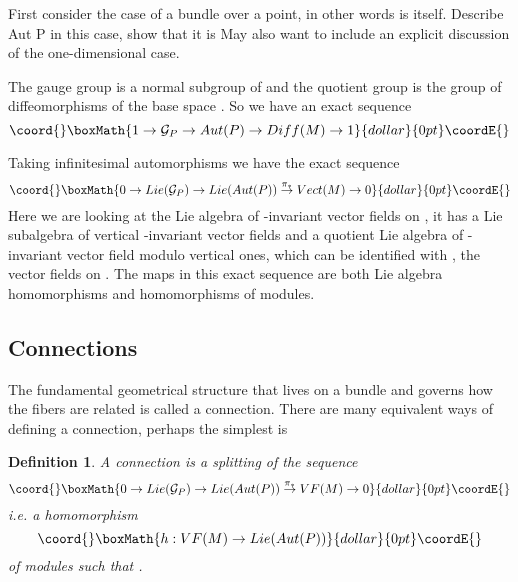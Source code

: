 \documentclass[a4paper,a4paper]{article}
\newtheorem{define}{Definition}
\theoremstyle{conjecture}
\begin{document}
First consider the case of a \coordHE{} bundle over a point, in other words \coordHE{} is \coordHE{} itself.  Describe Aut P in this case, show that it is \coordHE{}
May also want to include an explicit discussion of the one-dimensional case.

The gauge group \coordHE{} is a normal subgroup of \coordHE{} and the
quotient group is the group \coordHE{} of diffeomorphisms of the base space \coordHE{}.  So we have an exact sequence 
$$\coord{}\boxMath{1\rightarrow {\mathcal G}_P\rightarrow Aut(P)\rightarrow Diff(M)\rightarrow 1}{dollar}{0pt}\coordE{}$$

Taking infinitesimal automorphisms we have the exact sequence
$$\coord{}\boxMath{0\rightarrow Lie ({\mathcal G}_P)\rightarrow Lie(Aut(P))\stackrel{\pi_*}\rightarrow Vect(M)\rightarrow 0}{dollar}{0pt}\coordE{}$$
Here we are looking at the Lie algebra of \coordHE{}-invariant vector fields
on \coordHE{}, it has a Lie subalgebra of vertical \coordHE{}-invariant vector fields and a quotient Lie algebra of \coordHE{}-invariant vector field modulo vertical
ones, which can be identified with \coordHE{}, the vector fields on \coordHE{}.  The maps in this exact sequence
are both Lie algebra homomorphisms and homomorphisms of \coordHE{} modules.


\subsection {Connections}

The fundamental geometrical structure that lives on a bundle and governs how the fibers are related is called a connection.  
There are many equivalent ways of defining a connection, perhaps the simplest is

\begin{define}
A connection is a splitting \coordHE{} of the sequence
$$\coord{}\boxMath{0\rightarrow Lie ({\mathcal G}_P)\rightarrow Lie(Aut(P))\stackrel{\pi_*}\rightarrow VF(M)\rightarrow 0}{dollar}{0pt}\coordE{}$$
i.e. a homomorphism 
$$\coord{}\boxMath{h:VF(M)\rightarrow  Lie(Aut(P))}{dollar}{0pt}\coordE{}$$
of \coordHE{} modules such that \coordHE{}.
\end{define}
\end{document}

